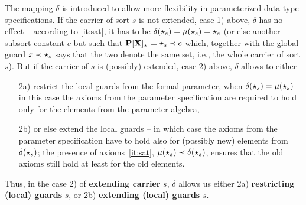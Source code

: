 The mapping $\delta$ is introduced to allow more flexibility in
parameterized data type specifications. If the carrier of sort $s$ is not
extended, case 1) above, $\delta$ has no effect -- according to
\ref{it:sat}, it has to be $\delta(\star_s)=\mu(\star_s)=\star_s$ (or else
another subsort constant $c$ but such that ${\bf P[X]_\star}\models
\star_s\prec c$ which, together with the global guard $x\prec \star_s$ says
that the two denote the same set, i.e., the whole carrier of sort $s$). But if the carrier of $s$
is (possibly) extended, case 2) above, $\delta$ allows to
either 
\begin{itemize}\MyLPar
\item[2a)] restrict the local guards from the formal parameter, when
$\delta(\star_s)=\mu(\star_s)$ -- in this case the axioms from
the parameter specification are required to hold only for the elements from the
parameter algebra, 
\item[2b)] 
or else extend the local guards -- in which case the axioms from the parameter
specification have to hold also for (possibly new) elements from
$\delta(\star_s)$; the presence of axioms~\ref{it:sat}, $\mu(\star_s) \prec
\delta(\star_s)$, ensures that the old axioms still hold at least for the old elements.
\end{itemize}
Thus, in the case 2) of {\bf extending carrier} $s$, 
$\delta$ allows us either 2a) {\bf restricting (local) guards} $s$,
or 2b) {\bf extending (local) guards} $s$.

